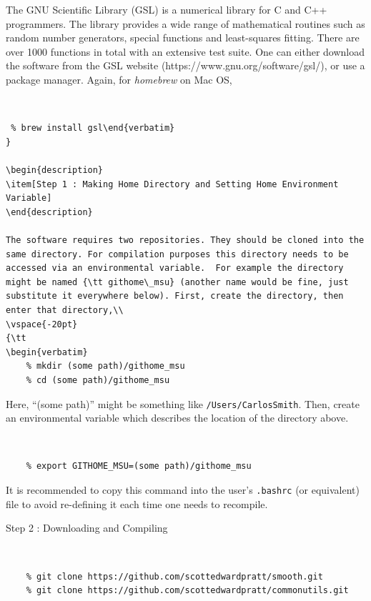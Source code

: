 \documentclass[12pt]{article}
\numberwithin{equation}{section}
\numberwithin{figure}{section}
\begin{document}
The GNU Scientific Library (GSL) is a numerical library for C and C++ programmers. The library provides a wide range of mathematical routines such as random number generators, special functions and least-squares fitting. There are over 1000 functions in total with an extensive test suite. One can either download the software from the GSL website (https://www.gnu.org/software/gsl/), or use a package manager. Again, for {\it homebrew} on Mac OS,\\
\vspace{-20pt}
{\tt 
\begin{verbatim} % brew install gsl\end{verbatim}
}

\begin{description}
\item[Step 1 : Making Home Directory and Setting Home Environment Variable]
\end{description}

The software requires two repositories. They should be cloned into the same directory. For compilation purposes this directory needs to be accessed via an environmental variable.  For example the directory might be named {\tt githome\_msu} (another name would be fine, just substitute it everywhere below). First, create the directory, then enter that directory,\\
\vspace{-20pt}
{\tt 
\begin{verbatim}
    % mkdir (some path)/githome_msu
    % cd (some path)/githome_msu
\end{verbatim}
}
Here, ``(some path)'' might be something like {\tt /Users/CarlosSmith}. Then, create an environmental variable which describes the location of the directory above.\\
\vspace{-20pt}
{\tt 
\begin{verbatim}
    % export GITHOME_MSU=(some path)/githome_msu
\end{verbatim}
}
It is recommended to copy this command into the user's {\tt .bashrc} (or equivalent) file to avoid re-defining it each time one needs to recompile.

\begin{description}
\item[Step 2 : Downloading and Compiling]\label{sec:Downloading and Compiling}
\end{description}
\vspace{-20pt}
{\tt 
\begin{verbatim}
    % git clone https://github.com/scottedwardpratt/smooth.git
    % git clone https://github.com/scottedwardpratt/commonutils.git
\end{verbatim}
}
\end{document}
